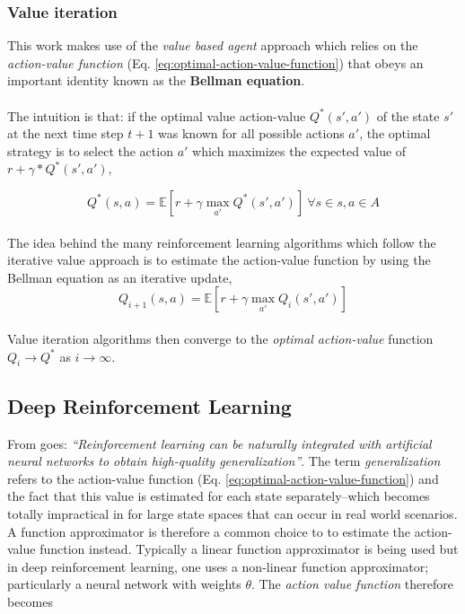 \subsubsection{Value iteration}

This work makes use of the \textit{value based agent} approach which relies on the \textit{action-value function} (Eq. \ref{eq:optimal-action-value-function}) that obeys an important identity known as the \textbf{Bellman equation}. 
\\
\\
The intuition is that: if the optimal value action-value $Q^*(s',a')$ of the state $s'$ at the next time step $t+1$ was known for all possible actions $a'$, the optimal strategy is to select the action $a'$ which maximizes the expected value of $r+\gamma*Q^*(s',a')$,

\begin{equation}\label{eq:bellman}
Q^*(s,a)=\mathbb{E}[r+\gamma \max_{a'} Q^*(s',a')] \ \forall{s}\in{s},  a\in{A}
\end{equation}
\\
The idea behind the many reinforcement learning algorithms which follow the iterative value approach is to estimate the action-value function by using the Bellman equation as an iterative update,
\begin{equation}
Q_{i+1}(s,a)=\mathbb{E}[r+\gamma \max_{a'}Q_{i}(s',a')]
\end{equation}
\\
Value iteration algorithms then converge to the \textit{optimal action-value} function $Q_{i} \rightarrow Q^*$ as $i \rightarrow \infty$. \cite{sutton1998reinforcement}

\subsection{Deep Reinforcement Learning}

From \cite{deeprlcourse} goes: \textit{``Reinforcement learning can be naturally integrated with artificial neural networks to obtain high-quality generalization''}.
The term \textit{generalization} refers to the action-value function (Eq. \ref{eq:optimal-action-value-function}) and the fact that this value is estimated for each state separately--which becomes totally impractical in for large state spaces that can occur in real world scenarios.
A function approximator is therefore a common choice to to estimate the action-value function instead. Typically a linear function approximator is being used but in deep reinforcement learning, one uses a non-linear function approximator; particularly a neural network with weights $\theta$. The \textit{action value function} therefore becomes

